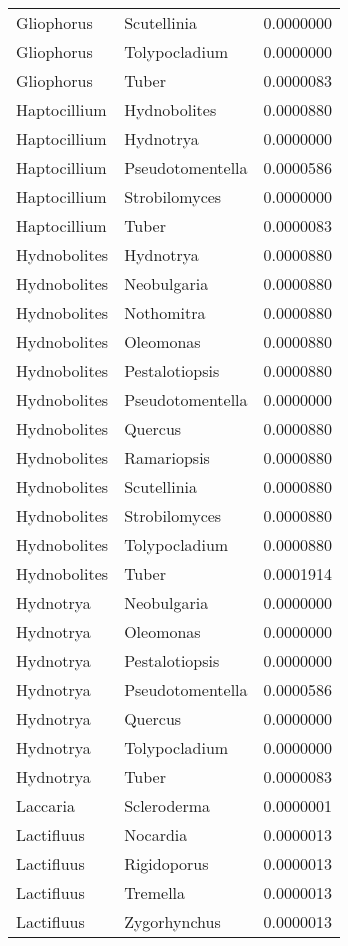 \documentclass[border=1mm]{standalone}
\begin{document}
\begin{longtable}[t]{lll}
Gliophorus & Scutellinia & 0.0000000\\
Gliophorus & Tolypocladium & 0.0000000\\
Gliophorus & Tuber & 0.0000083\\
\addlinespace
Haptocillium & Hydnobolites & 0.0000880\\
Haptocillium & Hydnotrya & 0.0000000\\
Haptocillium & Pseudotomentella & 0.0000586\\
Haptocillium & Strobilomyces & 0.0000000\\
Haptocillium & Tuber & 0.0000083\\
\addlinespace
Hydnobolites & Hydnotrya & 0.0000880\\
Hydnobolites & Neobulgaria & 0.0000880\\
Hydnobolites & Nothomitra & 0.0000880\\
Hydnobolites & Oleomonas & 0.0000880\\
Hydnobolites & Pestalotiopsis & 0.0000880\\
\addlinespace
Hydnobolites & Pseudotomentella & 0.0000000\\
Hydnobolites & Quercus & 0.0000880\\
Hydnobolites & Ramariopsis & 0.0000880\\
Hydnobolites & Scutellinia & 0.0000880\\
Hydnobolites & Strobilomyces & 0.0000880\\
\addlinespace
Hydnobolites & Tolypocladium & 0.0000880\\
Hydnobolites & Tuber & 0.0001914\\
Hydnotrya & Neobulgaria & 0.0000000\\
Hydnotrya & Oleomonas & 0.0000000\\
Hydnotrya & Pestalotiopsis & 0.0000000\\
\addlinespace
Hydnotrya & Pseudotomentella & 0.0000586\\
Hydnotrya & Quercus & 0.0000000\\
Hydnotrya & Tolypocladium & 0.0000000\\
Hydnotrya & Tuber & 0.0000083\\
Laccaria & Scleroderma & 0.0000001\\
\addlinespace
Lactifluus & Nocardia & 0.0000013\\
Lactifluus & Rigidoporus & 0.0000013\\
Lactifluus & Tremella & 0.0000013\\
Lactifluus & Zygorhynchus & 0.0000013\\

\end{longtable}
\end{document}
